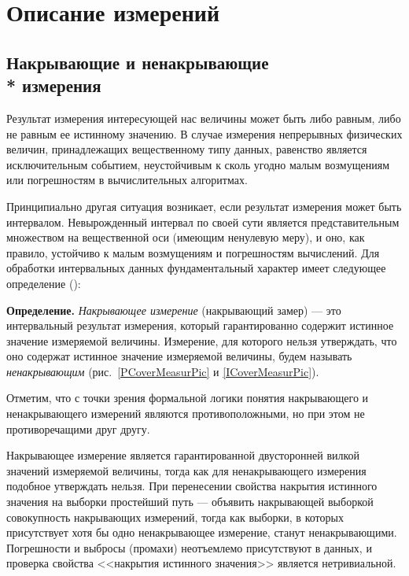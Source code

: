 \documentclass[a5paper,openany]{book}
\begin{document}
{	\section{Описание измерений}
	
\subsection{Накрывающие и ненакрывающие \\* измерения} 
\label{CoverMeasrSect} 


Результат измерения интересующей нас величины может быть либо равным, либо не равным ее истинному значению.
В случае измерения непрерывных физических величин, принадлежащих вещественному типу данных, равенство 
является исключительным событием,  неустойчивым к сколь угодно малым возмущениям или погрешностям в вычислительных алгоритмах. 

Принципиально другая ситуация возникает, если результат измерения может быть интервалом. 
Невырожденный интервал по своей сути является  представительным множеством на  
вещественной оси (имеющим ненулевую меру), и оно, как правило, устойчиво к малым возмущениям и 
погрешностям вычислений. Для обработки интервальных данных 
фундаментальный характер имеет следующее определение (\cite{MetodikaBook, Enclosing2022}):

{\bf Определение.}
	\textsl{Накрывающее измерение} (накрывающий замер) --- это интервальный результат 
	измерения, который гарантированно содержит истинное значение измеряемой величины. 
	Измерение, для которого нельзя утверждать, что оно содержат истинное значение 
	измеряемой величины, будем называть \textsl{ненакрывающим} (рис.~\ref{PCoverMeasurPic} 
	и \ref{ICoverMeasurPic}).  

Отметим, что с точки зрения формальной логики понятия накрывающего и ненакрывающего 
измерений являются противоположными, но при этом не противоречащими друг другу. 

Накрывающее измерение является гарантированной двусторонней вилкой значений 
измеряемой величины, тогда как для ненакрывающего измерения  подобное утверждать 
нельзя. При перенесении свойства накрытия истинного значения на выборки простейший путь --- объявить накрывающей выборкой совокупность накрывающих измерений, тогда как выборки, в которых присутствует хотя бы одно ненакрывающее измерение, станут ненакрывающими. 
Погрешности и выбросы (промахи) неотъемлемо присутствуют в данных, и проверка свойства <<накрытия истинного значения>> является нетривиальной. 

}
\end{document}
